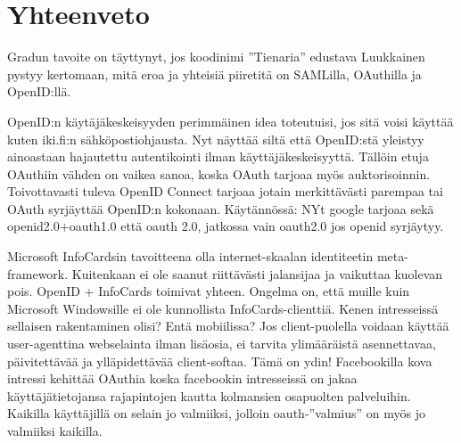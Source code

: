 \documentclass[finnish,gradu]{tktltiki}
\begin{document}






\section{Yhteenveto} %
\label{sec:yhteenveto}

    Gradun tavoite on täyttynyt, jos koodinimi ''Tienaria'' edustava Luukkainen pystyy kertomaan, mitä eroa ja yhteisiä piiretitä on SAMLilla, OAuthilla ja OpenID:llä.

    OpenID:n käytäjäkeskeisyyden perimmäinen idea toteutuisi, jos sitä voisi käyttää kuten iki.fi:n sähköpostiohjausta. Nyt näyttää siltä että OpenID:stä yleistyy ainoastaan hajautettu autentikointi ilman käyttäjäkeskeisyyttä. Tällöin etuja OAuthiin vähden on vaikea sanoa, koska OAuth tarjoaa myös auktorisoinnin. Toivottavasti tuleva OpenID Connect tarjoaa jotain merkittävästi parempaa tai OAuth syrjäyttää OpenID:n kokonaan. Käytännössä: NYt google tarjoaa sekä openid2.0+oauth1.0 että oauth 2.0, jatkossa vain oauth2.0 jos openid syrjäytyy.

 Microsoft InfoCardsin tavoitteena olla internet-skaalan identiteetin meta-framework. Kuitenkaan ei ole saanut riittävästi jalansijaa ja vaikuttaa kuolevan pois. OpenID + InfoCards toimivat yhteen. Ongelma on, että muille kuin Microsoft Windowsille ei ole kunnollista InfoCards-clienttiä. Kenen intresseissä sellaisen rakentaminen olisi? Entä mobiilissa? Jos client-puolella voidaan käyttää user-agenttina webselainta ilman lisäosia, ei tarvita ylimääräistä asennettavaa, päivitettävää ja ylläpidettävää client-softaa. Tämä on ydin! Facebookilla kova intressi kehittää OAuthia koska facebookin intresseissä on jakaa käyttäjätietojansa rajapintojen kautta kolmansien osapuolten palveluihin. Kaikilla käyttäjillä on selain jo valmiiksi, jolloin oauth-''valmius'' on myös jo valmiiksi kaikilla.






\lastpage
\end{document}
